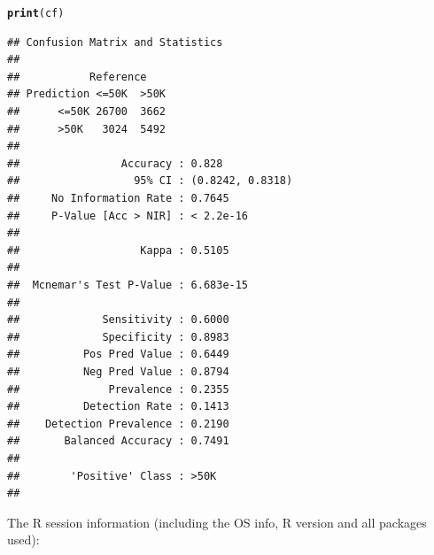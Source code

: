 \documentclass{article}\usepackage[]{graphicx}\usepackage[]{xcolor}
\makeatletter
\newcommand{\hlstd}[1]{\textcolor[rgb]{0.345,0.345,0.345}{#1}}%
\newcommand{\hlkwd}[1]{\textcolor[rgb]{0.737,0.353,0.396}{\textbf{#1}}}%
\newenvironment{kframe}{%
 \def\at@end@of@kframe{}%
 \ifinner\ifhmode%
  \def\at@end@of@kframe{\end{minipage}}%
  \begin{minipage}{\columnwidth}%
 \fi\fi%
 \def\FrameCommand##1{\hskip\@totalleftmargin \hskip-\fboxsep
 \colorbox{shadecolor}{##1}\hskip-\fboxsep
     \hskip-\linewidth \hskip-\@totalleftmargin \hskip\columnwidth}%
 \MakeFramed {\advance\hsize-\width
   \@totalleftmargin\z@ \linewidth\hsize
   \@setminipage}}%
 {\par\unskip\endMakeFramed%
 \at@end@of@kframe}
\newenvironment{knitrout}{}{} %
\makeatother
\begin{document}
\begin{knitrout}
\begin{kframe}
\begin{alltt}
\hlkwd{print}\hlstd{(cf)}
\end{alltt}
\begin{verbatim}
## Confusion Matrix and Statistics
## 
##           Reference
## Prediction <=50K  >50K
##      <=50K 26700  3662
##      >50K   3024  5492
##                                           
##                Accuracy : 0.828           
##                  95% CI : (0.8242, 0.8318)
##     No Information Rate : 0.7645          
##     P-Value [Acc > NIR] : < 2.2e-16       
##                                           
##                   Kappa : 0.5105          
##                                           
##  Mcnemar's Test P-Value : 6.683e-15       
##                                           
##             Sensitivity : 0.6000          
##             Specificity : 0.8983          
##          Pos Pred Value : 0.6449          
##          Neg Pred Value : 0.8794          
##              Prevalence : 0.2355          
##          Detection Rate : 0.1413          
##    Detection Prevalence : 0.2190          
##       Balanced Accuracy : 0.7491          
##                                           
##        'Positive' Class : >50K            
## 
\end{verbatim}
\end{kframe}
\end{knitrout}

The R session information (including the OS info, R version and all
packages used):
\end{document}
